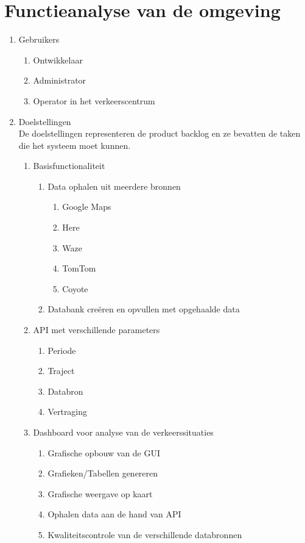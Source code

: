 \documentclass[ps,a4paper,oneside]{report}
\begin{document}
\section{Functieanalyse van de omgeving}
\begin{enumerate}
	\item Gebruikers
	\begin{enumerate}
		\item Ontwikkelaar
		\item Administrator
		\item Operator in het verkeerscentrum
	\end{enumerate}
\item Doelstellingen\\
De doelstellingen representeren de product backlog en ze bevatten de taken die het systeem moet kunnen.
\begin{enumerate}
	\item Basisfunctionaliteit
		\begin{enumerate}
			\item Data ophalen uit meerdere bronnen
			\begin{enumerate}
				\item Google Maps
				\item Here
				\item Waze
				\item TomTom
				\item Coyote
			\end{enumerate}
			\item Databank cre\"eren en opvullen met opgehaalde data
		\end{enumerate}
	\item API met verschillende parameters
	\begin{enumerate}
		\item Periode
		\item Traject
		\item Databron
		\item Vertraging
	\end{enumerate}
	\item Dashboard voor analyse van de verkeerssituaties
	\begin{enumerate}
		\item Grafische opbouw van de GUI
		\item Grafieken/Tabellen genereren
		\item Grafische weergave op kaart
		\item Ophalen data aan de hand van API
		\item Kwaliteitscontrole van de verschillende databronnen
	\end{enumerate}
\end{enumerate}
\end{enumerate}
\end{document}
